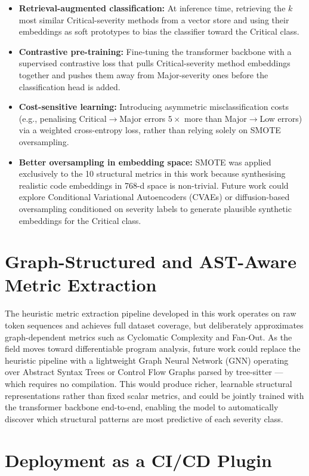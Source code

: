 \documentclass[12pt, a4paper]{report}
\begin{document}
\begin{itemize}
  \item \textbf{Retrieval-augmented classification:} At inference time,
  retrieving the $k$ most similar Critical-severity methods from a vector
  store and using their embeddings as soft prototypes to bias the classifier
  toward the Critical class.
  \item \textbf{Contrastive pre-training:} Fine-tuning the transformer
  backbone with a supervised contrastive loss that pulls Critical-severity
  method embeddings together and pushes them away from Major-severity ones
  before the classification head is added.
  \item \textbf{Cost-sensitive learning:} Introducing asymmetric
  misclassification costs (e.g., penalising Critical$\to$Major errors $5\times$
  more than Major$\to$Low errors) via a weighted cross-entropy loss, rather
  than relying solely on SMOTE oversampling.
  \item \textbf{Better oversampling in embedding space:} SMOTE was applied
  exclusively to the 10 structural metrics in this work because synthesising
  realistic code embeddings in 768-d space is non-trivial. Future work could
  explore Conditional Variational Autoencoders (CVAEs) or diffusion-based
  oversampling conditioned on severity labels to generate plausible synthetic
  embeddings for the Critical class.
\end{itemize}

\section{Graph-Structured and AST-Aware Metric Extraction}

The heuristic metric extraction pipeline developed in this work operates on
raw token sequences and achieves full dataset coverage, but deliberately
approximates graph-dependent metrics such as Cyclomatic Complexity and
Fan-Out. As the field moves toward differentiable program analysis, future
work could replace the heuristic pipeline with a lightweight Graph Neural
Network (GNN) operating over Abstract Syntax Trees or Control Flow Graphs
parsed by tree-sitter --- which requires no compilation. This would produce
richer, learnable structural representations rather than fixed scalar metrics,
and could be jointly trained with the transformer backbone end-to-end,
enabling the model to automatically discover which structural patterns are
most predictive of each severity class.

\section{Deployment as a CI/CD Plugin}
\end{document}
